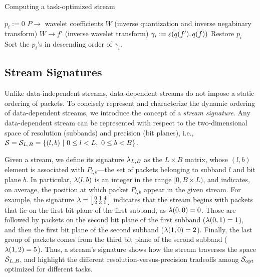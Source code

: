 \begin{algorithm}[h]
  \caption{Computing a task-optimized stream}
  \begin{algorithmic}[1]
			\State $p_i := 0$
      \State $P \rightarrow$ wavelet coefficients $W$ (inverse quantization and inverse negabinary transform)
			\State $W \rightarrow f'$ (inverse wavelet transform)
			\State $\gamma_i := \err(q(f'),q(f))$			
			\State Restore $p_i$
		\EndFor
		\State Sort the $p_i$'s in descending order of $\gamma_i$.
	\end{algorithmic}
	\label{alg:greedy}
\end{algorithm}

\subsection{Stream Signatures} \label{sec:stream-signature}

Unlike data-independent streams, data-dependent streams do not impose a static ordering of packets.
To concisely represent and characterize the dynamic ordering of data-dependent streams, we introduce
the concept of a \emph{stream signature}.  Any data-dependent stream can be represented with respect
to the two-dimensional space of resolution (subbands) and precision (bit planes), i.e., \mbox{$\strm
= \strm_{L,B}=\{(l,b)\ |\ 0\leq l < L,\ 0\leq b < B\}$.} 

Given a stream, we define its signature $\sgn_{L,B}$ as the $L \times B$ matrix, whose $(l,b)$
element is associated with $P_{l,b}$---the set of packets belonging to subband $l$ and bit plane
$b$. In particular, $\sgn(l,b)$ is an integer in the range $[0, B\times L)$, and indicates, on
average, the position at which packet $P_{l,b}$ appear in the given stream. For example, the
signature $\sgn=\bigl[ \begin{smallmatrix}0 & 1 & 4\\ 2 & 3 & 5\end{smallmatrix}\bigr]$ indicates
that the stream begins with packets that lie on the first bit plane of the first subband, as
$\sgn(0,0)=0$. Those are followed by packets on the second bit plane of the first subband
($\sgn(0,1)=1$), and then the first bit plane of the second subband ($\sgn(1,0)=2$). Finally, the
last group of packets comes from the third bit plane of the second subband ($\sgn(1,2)=5$). Thus, a
stream's signature shows how the stream traverses the space $\strm_{L,B}$, and highlight the
different resolution-versus-precision tradeoffs among $\sopt$ optimized for different tasks.

